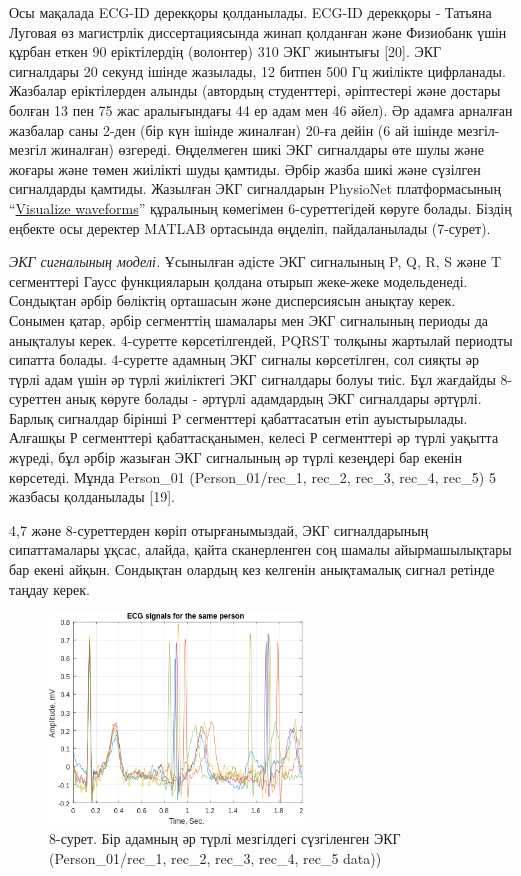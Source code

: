 \begin{multicols}{2}
Осы мақалада ECG-ID дерекқоры қолданылады. ECG-ID дерекқоры - Татьяна
Луговая өз магистрлік диссертациясында жинап қолданған және Физиобанк
үшін құрбан еткен 90 еріктілердің (волонтер) 310 ЭКГ жиынтығы {[}20{]}.
ЭКГ сигналдары 20 секунд ішінде жазылады, 12 битпен 500 Гц жиілікте
цифрланады. Жазбалар еріктілерден алынды (автордың студенттері,
әріптестері және достары болған 13 пен 75 жас аралығындағы 44 ер адам
мен 46 әйел). Әр адамға арналған жазбалар саны 2-ден (бір күн ішінде
жиналған) 20-ға дейін (6 ай ішінде мезгіл-мезгіл жиналған) өзгереді.
Өңделмеген шикі ЭКГ сигналдары өте шулы және жоғары және төмен жиілікті
шуды қамтиды. Әрбір жазба шикі және сүзілген сигналдарды қамтиды.
Жазылған ЭКГ сигналдарын PhysioNet платформасының
``\href{https://physionet.org/lightwave/?db=ecgiddb/1.0.0}{Visualize
waveforms}'' құралының көмегімен 6-суреттегідей көруге болады. Біздің
еңбекте осы деректер MATLAB ортасында өңделіп, пайдаланылады (7-сурет).

\emph{ЭКГ сигналының моделі.} Ұсынылған әдісте ЭКГ сигналының P, Q, R, S
және T сегменттері Гаусс функцияларын қолдана отырып жеке-жеке
модельденеді. Сондықтан әрбір бөліктің орташасын және дисперсиясын
анықтау керек. Сонымен қатар, әрбір сегменттің шамалары мен ЭКГ
сигналының периоды да анықталуы керек. 4-суретте көрсетілгендей, PQRST
толқыны жартылай периодты сипатта болады. 4-суретте адамның ЭКГ сигналы
көрсетілген, сол сияқты әр түрлі адам үшін әр түрлі жиіліктегі ЭКГ
сигналдары болуы тиіс. Бұл жағдайды 8-суреттен анық көруге болады -
әртүрлі адамдардың ЭКГ сигналдары әртүрлі. Барлық сигналдар бірінші P
сегменттері қабаттасатын етіп ауыстырылады. Алғашқы Р сегменттері
қабаттасқанымен, келесі Р сегменттері әр түрлі уақытта жүреді, бұл әрбір
жазыған ЭКГ сигналының әр түрлі кезеңдері бар екенін көрсетеді. Мұнда
Person\_01 (Person\_01/rec\_1, rec\_2, rec\_3, rec\_4, rec\_5) 5 жазбасы
қолданылады {[}19{]}.

4,7 және 8-суреттерден көріп отырғанымыздай, ЭКГ сигналдарының
сипаттамалары ұқсас, алайда, қайта сканерленген соң шамалы
айырмашылықтары бар екені айқын. Сондықтан олардың кез келгенін
анықтамалық сигнал ретінде таңдау керек.
\end{multicols}

\begin{figure}[H]
	\centering
	\includegraphics[width=0.6\textwidth]{media/ict/image48}
	\caption*{8-сурет. Бір адамның әр түрлі мезгілдегі сүзгіленген ЭКГ (Person\_01/rec\_1, rec\_2, rec\_3, rec\_4, rec\_5 data))}
\end{figure}


